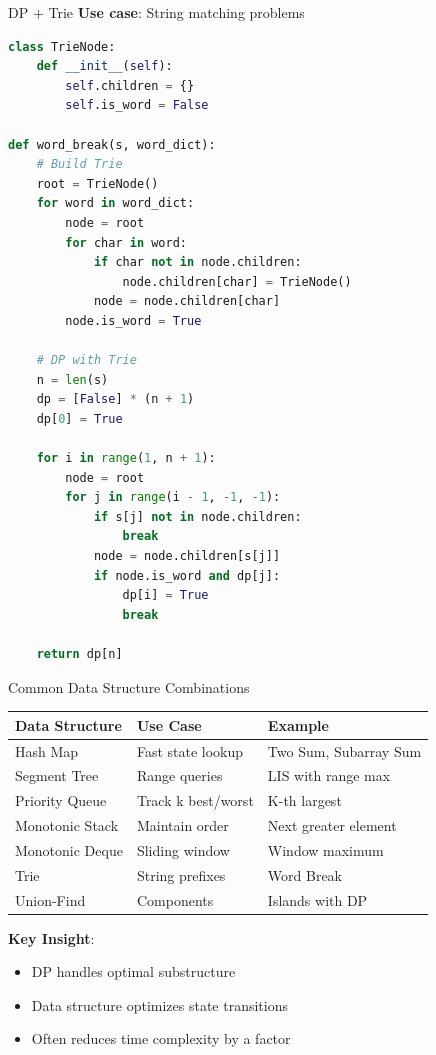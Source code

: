 \documentclass[aspectratio=169]{beamer}
\begin{document}
\begin{frame}[fragile]{DP + Trie}
  \textbf{Use case}: String matching problems

\begin{lstlisting}[language=Python, basicstyle=\ttfamily\tiny]
class TrieNode:
    def __init__(self):
        self.children = {}
        self.is_word = False

def word_break(s, word_dict):
    # Build Trie
    root = TrieNode()
    for word in word_dict:
        node = root
        for char in word:
            if char not in node.children:
                node.children[char] = TrieNode()
            node = node.children[char]
        node.is_word = True

    # DP with Trie
    n = len(s)
    dp = [False] * (n + 1)
    dp[0] = True

    for i in range(1, n + 1):
        node = root
        for j in range(i - 1, -1, -1):
            if s[j] not in node.children:
                break
            node = node.children[s[j]]
            if node.is_word and dp[j]:
                dp[i] = True
                break

    return dp[n]
\end{lstlisting}
\end{frame}

\begin{frame}{Common Data Structure Combinations}
  \begin{center}
  \small
  \begin{tabular}{|l|l|l|}
    \hline
    \textbf{Data Structure} & \textbf{Use Case} & \textbf{Example} \\
    \hline
    Hash Map & Fast state lookup & Two Sum, Subarray Sum \\
    Segment Tree & Range queries & LIS with range max \\
    Priority Queue & Track k best/worst & K-th largest \\
    Monotonic Stack & Maintain order & Next greater element \\
    Monotonic Deque & Sliding window & Window maximum \\
    Trie & String prefixes & Word Break \\
    Union-Find & Components & Islands with DP \\
    \hline
  \end{tabular}
  \end{center}

  \vspace{0.5cm}

  \textbf{Key Insight}:
  \begin{itemize}
    \item DP handles optimal substructure
    \item Data structure optimizes state transitions
    \item Often reduces time complexity by a factor
  \end{itemize}
\end{frame}
\end{document}
